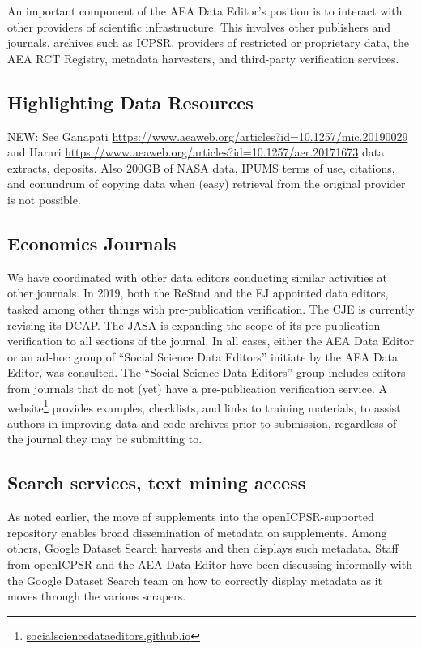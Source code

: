 \documentclass[PP]{AEA}
\newcommand{\urlcite}[2]{#2\footnote{\url{#1}}}
\begin{document}
An important component of the AEA Data Editor's position is to interact with other providers of scientific infrastructure. This involves other publishers and journals, archives such as ICPSR, providers of restricted or proprietary data, the AEA RCT Registry, metadata harvesters, and third-party verification services. 

\subsection{Highlighting Data Resources}

NEW: See Ganapati \url{https://www.aeaweb.org/articles?id=10.1257/mic.20190029} and Harari \url{https://www.aeaweb.org/articles?id=10.1257/aer.20171673} data extracts, deposits. Also 200GB of NASA data, IPUMS terms of use, citations, and conundrum of copying data when (easy) retrieval from the original provider is not possible.

\subsection{Economics Journals}

We have coordinated with other data editors conducting similar activities at other journals. In 2019, both the \ac{ReStud} and the \ac{EJ}  appointed data editors, tasked among other things with pre-publication verification. The \ac{CJE} is currently revising its \ac{DCAP}. The \ac{JASA} is expanding the scope of its pre-publication verification to all sections of the journal. In all cases, either the AEA Data Editor or an ad-hoc group of ``Social Science Data Editors'' initiate by the AEA Data Editor, was consulted. The ``Social Science Data Editors'' group includes  editors from journals that do not (yet) have a pre-publication verification service. A  \urlcite{socialsciencedataeditors.github.io}{website} provides examples, checklists, and links to training materials, to assist authors in  improving data and code archives prior to submission, regardless of the journal they may be submitting to.

\subsection{Search services, text mining access}
As noted earlier, the move of supplements into the openICPSR-supported repository enables broad dissemination of metadata on supplements. Among others, Google Dataset Search harvests and then displays such metadata. Staff from openICPSR and the AEA Data Editor have been discussing informally with the Google Dataset Search team on how to correctly display metadata as it moves through the various scrapers. 
\end{document}
